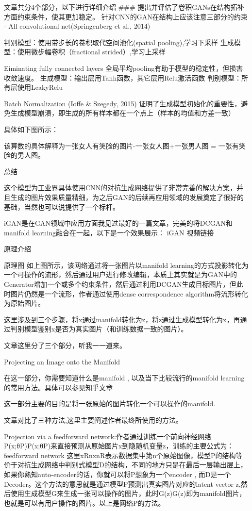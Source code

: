 文章共分4个部分，以下进行详细介绍 ### 提出并评估了卷积GANs在结构拓补方面约束条件，使其更加稳定。 针对CNN的GAN在结构上应该注意三部分的约束 - All convolutional net(Springenberg et al., 2014)

判别模型：使用带步长的卷积取代空间池化(spatial pooling),学习下采样 生成模型：使用微步幅卷积（fractional strided）,学习上采样

Eiminating fully connected layers
全局平均pooling有助于模型的稳定性，但损害收敛速度。 生成模型：输出层用Tanh函数，其它层用Relu激活函数 判别模型：所有层使用LeakyRelu

Batch Normalization (Ioffe & Szegedy, 2015)
证明了生成模型初始化的重要性，避免生成模型崩溃，即生成的所有样本都在一个点上（样本的均值和方差一致）

具体如下图所示：

该算数的具体解释为一张女人有笑脸的图片-一张女人图+一张男人图 = 一张有笑脸的男人图。

总结

这个模型为工业界具体使用CNN的对抗生成网络提供了非常完善的解决方案，并且生成的图片效果质量精细，为之后GAN的后续再应用领域的发展奠定了很好的基础，当然也可以说提供了一个标杆。

iGAN是在GAN领域中应用方面我见过最好的一篇文章，完美的将DCGAN和manifold learning融合在一起，以下是一个效果展示： iGAN 视频链接

原理介绍

原理图 如上图所示，该网络通过将一张图片以manifold learning的方式投影转化为一个可操作的流形，然后通过用户进行修改编辑，本质上其实就是为GAN中的Generator增加一个或多个约束条件，然后通过利用DCGAN生成目标图片，但此时图片仍然是一个流形，作者通过使用dense correspondence algorithm将流形转化为原始图片。

这里涉及到三个步骤，将x通过manifold转化为z，将z通过生成模型转化为x，再通过判别模型鉴别x是否为真实图片（和训练数据一致的图片）。

文章这里分了三个部分，听我一一道来。

Projecting an Image onto the Manifold

在这一部分，你需要知道什么是manifold , 以及当下比较流行的manifold learning的常用方法。具体可以参见知乎文章

这一部分主要的目的是将一张原始的图片转化一个可以操作的manifold.

文章对比了三种方法,这里主要阐述作者最终所使用的方法。

Projection via a feedforward network:作者通过训练一个前向神经网络P(x;θP)P(x;θP)来直接预测从原始图片x到隐随机变量z，训练的主要公式为： feedforward network 这里xRnxnR表示数据集中第n个原始图像，模型P的结构等价于对抗生成网络中判别式模型D的结构，不同的地方只是在最后一层输出层上，如果你熟知auto-encoder的话，你就可以将P想象为一个encoder , 而D是一个Decoder。这个方法的意思就是通过模型P预测出真实图片对应的latent vector z,然后使用生成模型G来生成一张可以操作的图片，此时G(z)G(z)即为manifold图片，也就是可以有用户操作的图片。以上是网络P的方法。

